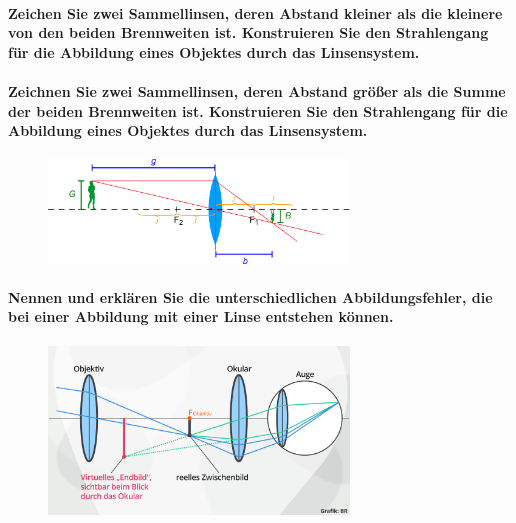 \documentclass[a4paper, 11pt, ngerman, parskip=half-]{scrartcl}
\begin{document}
\paragraph{Zeichen Sie zwei Sammellinsen, deren Abstand kleiner als die kleinere von den beiden
    Brennweiten ist. Konstruieren Sie den Strahlengang für die Abbildung eines Objektes durch
    das Linsensystem.}

\paragraph{Zeichnen Sie zwei Sammellinsen, deren Abstand größer als die Summe der beiden
    Brennweiten ist. Konstruieren Sie den Strahlengang für die Abbildung eines Objektes durch
    das Linsensystem.}

\begin{figure}[H]
    \centering
    \includegraphics[width=8cm]{image/18/geo22}
\end{figure}


\paragraph{Nennen und erklären Sie die unterschiedlichen Abbildungsfehler, die bei einer Abbildung
    mit einer Linse entstehen können.}

\begin{figure}[H]
    \centering
    \includegraphics[width=8cm]{image/18/geo23}
\end{figure}
\end{document}
